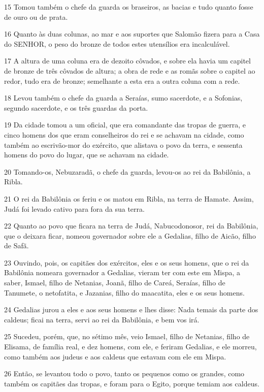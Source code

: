 \par 15 Tomou também o chefe da guarda os braseiros, as bacias e tudo quanto fosse de ouro ou de prata.
\par 16 Quanto às duas colunas, ao mar e aos suportes que Salomão fizera para a Casa do SENHOR, o peso do bronze de todos estes utensílios era incalculável.
\par 17 A altura de uma coluna era de dezoito côvados, e sobre ela havia um capitel de bronze de três côvados de altura; a obra de rede e as romãs sobre o capitel ao redor, tudo era de bronze; semelhante a esta era a outra coluna com a rede.
\par 18 Levou também o chefe da guarda a Seraías, sumo sacerdote, e a Sofonias, segundo sacerdote, e os três guardas da porta.
\par 19 Da cidade tomou a um oficial, que era comandante das tropas de guerra, e cinco homens dos que eram conselheiros do rei e se achavam na cidade, como também ao escrivão-mor do exército, que alistava o povo da terra, e sessenta homens do povo do lugar, que se achavam na cidade.
\par 20 Tomando-os, Nebuzaradã, o chefe da guarda, levou-os ao rei da Babilônia, a Ribla.
\par 21 O rei da Babilônia os feriu e os matou em Ribla, na terra de Hamate. Assim, Judá foi levado cativo para fora da sua terra.
\par 22 Quanto ao povo que ficara na terra de Judá, Nabucodonosor, rei da Babilônia, que o deixara ficar, nomeou governador sobre ele a Gedalias, filho de Aicão, filho de Safã.
\par 23 Ouvindo, pois, os capitães dos exércitos, eles e os seus homens, que o rei da Babilônia nomeara governador a Gedalias, vieram ter com este em Mispa, a saber, Ismael, filho de Netanias, Joanã, filho de Careá, Seraías, filho de Tanumete, o netofatita, e Jazanias, filho do maacatita, eles e os seus homens.
\par 24 Gedalias jurou a eles e aos seus homens e lhes disse: Nada temais da parte dos caldeus; ficai na terra, servi ao rei da Babilônia, e bem vos irá.
\par 25 Sucedeu, porém, que, no sétimo mês, veio Ismael, filho de Netanias, filho de Elisama, de família real, e dez homens, com ele, e feriram Gedalias, e ele morreu, como também aos judeus e aos caldeus que estavam com ele em Mispa.
\par 26 Então, se levantou todo o povo, tanto os pequenos como os grandes, como também os capitães das tropas, e foram para o Egito, porque temiam aos caldeus.
